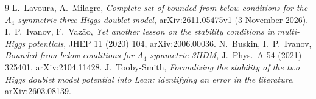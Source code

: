 \documentclass[11pt,a4paper]{amsart}
\theoremstyle{remark}
\begin{document}
\begin{thebibliography}{9}
 L.~Lavoura, A.~Milagre, \emph{Complete set of bounded-from-below conditions for the
$A_4$-symmetric three-Higgs-doublet model}, arXiv:2611.05475v1 (3 November 2026).
 I.~P.~Ivanov, F.~Vaz\~ao, \emph{Yet another lesson on the stability conditions in multi-Higgs
potentials}, JHEP 11 (2020) 104, arXiv:2006.00036.
 N.~Buskin, I.~P.~Ivanov, \emph{Bounded-from-below conditions for $A_4$-symmetric 3HDM},
J.~Phys.~A 54 (2021) 325401, arXiv:2104.11428.
 J.~Tooby-Smith, \emph{Formalizing the stability of the two Higgs doublet model potential into
Lean: identifying an error in the literature}, arXiv:2603.08139.
\end{thebibliography}
\end{document}
